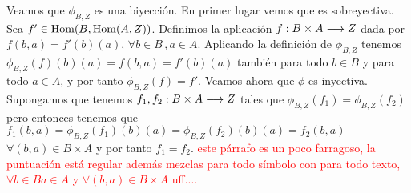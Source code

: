 Veamos que $\phi_{B, Z}$ es una biyección.
En primer lugar vemos que es sobreyectiva.
Sea $f' \in \operatorname{Hom}(B, \operatorname{Hom}(A, Z))$. Definimos la aplicación
$f : B\times A\longrightarrow Z$ dada por $f(b, a) = f'(b)(a), \,  \forall b\in B \, , a \in A$. Aplicando
la definición de $\phi_{B, Z}$
tenemos $\phi_{B,Z}(f)(b)(a) = f(b, a) = f'(b)(a)$ también para
todo $b \in B$ y para todo $a \in A$, y por tanto
$\phi_{B,Z}(f) = f'$. Veamos ahora que $\phi$ es inyectiva. Supongamos
que tenemos $f_1, f_2 : B\times A\longrightarrow Z$ tales que
$\phi_{B, Z}(f_1) = \phi_{B, Z}(f_2)$ pero entonces tenemos que
$f_1(b, a) = \phi_{B, Z}(f_1)(b)(a) = \phi_{B,Z}(f_2)(b)(a) = f_2(b, a)$
$\forall (b, a) \in B\times A$
y por tanto $f_1 = f_2$. \textcolor{red}{este párrafo es un poco farragoso, la puntuación está regular además mezclas para todo símbolo con para todo texto, $\forall b\in B a\in A $ y $\forall (b,a)\in B\times A$ uff....}

